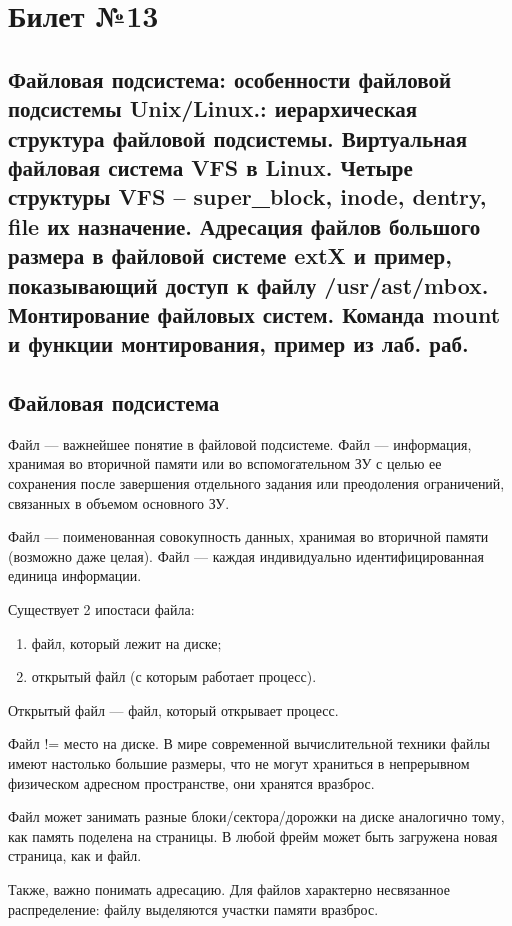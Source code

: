\chapter{Билет №13}

\section*{Файловая подсистема: особенности файловой подсистемы Unix/Linux.: иерархическая структура файловой подсистемы. Виртуальная файловая система VFS в Linux. Четыре структуры VFS – super\_block, inode, dentry, file их назначение. Адресация файлов большого размера в файловой системе extX и пример, показывающий доступ к файлу /usr/ast/mbox. Монтирование файловых систем. Команда mount и функции монтирования, пример из лаб. раб.}

\section{Файловая подсистема}
Файл --- важнейшее понятие в файловой подсистеме. Файл --- информация, хранимая во вторичной памяти или во вспомогательном ЗУ с целью ее сохранения после завершения отдельного задания или преодоления ограничений, связанных в объемом основного ЗУ.

Файл --- поименованная совокупность данных, хранимая во вторичной памяти (возможно даже целая). Файл --- каждая индивидуально идентифицированная единица информации.

Существует 2 ипостаси файла:
\begin{enumerate}
	\item файл, который лежит на диске;
	\item открытый файл (с которым работает процесс).
\end{enumerate}

Открытый файл --- файл, который открывает процесс.

Файл != место на диске. В мире современной вычислительной техники файлы имеют настолько большие размеры, что не могут храниться в непрерывном физическом адресном пространстве, они хранятся вразброс.

Файл может занимать разные блоки/сектора/дорожки на диске аналогично тому, как память поделена на страницы. В любой фрейм может быть загружена новая страница, как и файл. 

Также, важно понимать адресацию. Для файлов характерно несвязанное распределение: файлу выделяются участки памяти вразброс.

